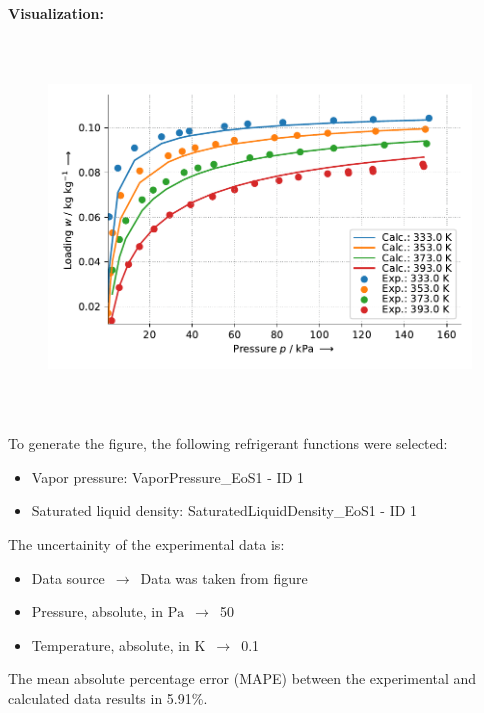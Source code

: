 \textbf{Visualization:}
%
\begin{figure}[!htp]
{\noindent\includegraphics[height=10cm, keepaspectratio]{figs/ads/ads_Propylene_zeolite_pellet_13X_Toth_2.pdf}}
\end{figure}
%

To generate the figure, the following refrigerant functions were selected:
\begin{itemize}
\item Vapor pressure: VaporPressure\_EoS1 - ID 1
\item Saturated liquid density: SaturatedLiquidDensity\_EoS1 - ID 1
\end{itemize}

The uncertainity of the experimental data is:
\begin{itemize}
\item Data source $\,\to\,$ Data was taken from figure
\item Pressure, absolute, in $\si{\pascal}$ $\,\to\,$ 50
\item Temperature, absolute, in $\si{\kelvin}$ $\,\to\,$ 0.1
\end{itemize}

The mean absolute percentage error (MAPE) between the experimental and calculated data results in 5.91\%.
\FloatBarrier
\newpage
